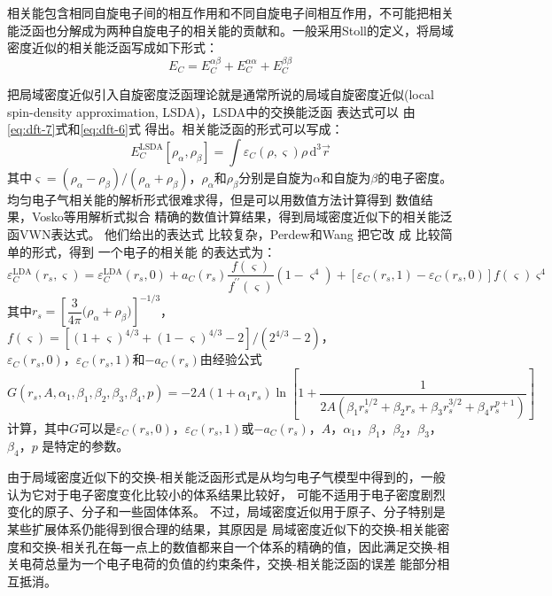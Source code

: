 相关能包含相同自旋电子间的相互作用和不同自旋电子间相互作用，不可能把相关能泛函也分解成为两种自旋电子的相关能的贡献和。一般采用Stoll的定义，将局域密度近似的相关能泛函写成如下形式：
\begin{equation}
  E_C=E_C^{\alpha\beta}+E_C^{\alpha\alpha}+E_C^{\beta\beta}
  \label{eq:dft-17}
\end{equation}

把局域密度近似引入自旋密度泛函理论就是通常所说的局域{自旋}密度近似(local spin-density approximation, LSDA)，LSDA中的交换能{泛函}%
{表达}式可以%
{由}\eqref{eq:dft-7}式和\eqref{eq:dft-6}式%
{得}出{。}相关能泛函的形式可以写成：
$$E_C^{\mathrm{LSDA}}[\rho_{\alpha},\rho_{\beta}]=\int{\varepsilon_C(\rho,\varsigma)\rho\,\textrm{d}^3\vec{r}}$$
其中$\varsigma=(\rho_{\alpha}-\rho_{\beta})
/(\rho_{\alpha}+\rho_{\beta})
$，$\rho_{\alpha}$和$\rho_{\beta}$分别是自旋为$\alpha$和自旋为$\beta$的电子密度。均匀电子气相关能的解析形式很难求得，但是可以用数值方法计算得到%
数值结果，Vosko等用解析式拟合%
精确的数值计算结果，得到局域密度近似下的相关能泛函VWN表达式{。}%
他们给出的表达式%
{比较}复杂，Perdew和Wang%
把它改%
成%
{比较}简单的形式，得到%
{一个电子的}相关能%
{的}表达式为：
\begin{equation}
  \label{eq:dft-8}
  \varepsilon_C^{\mathrm{LDA}}(r_s,\varsigma)=\varepsilon_C^{\mathrm{LDA}}(r_s,0)+a_C(r_s)\dfrac{f(\varsigma)}{f^{\prime\prime}(\varsigma)}(1-\varsigma^4)+[\varepsilon_C(r_s,1)-\varepsilon_C(r_s,0)]f(\varsigma)\varsigma^4
\end{equation}
其中$r_s=\left[\dfrac 3{4\pi}\bigl(\rho_{\alpha}+\rho_{\beta}\bigr)\right]^{-1/3}$，$f(\varsigma)=[(1+\varsigma)^{4/3}+(1-\varsigma)^{4/3}-2]/(2^{4/3}-2)$，\\$\varepsilon_C(r_s,0)$，$\varepsilon_C(r_s,1)$和$-a_C(r_s)$由经验公式
$$G(r_s,A,\alpha_1,\beta_1,\beta_2,\beta_3,\beta_4,p)=-2A(1+\alpha_1r_s)\ln\left[1+\dfrac1{2A(\beta_1r_s^{1/2}+\beta_2r_s+\beta_3r_s^{3/2}+\beta_4r_s^{p+1})}\right]$$
计算{，}其中{$G$可以是$\varepsilon_C(r_s,0)$，$\varepsilon_C(r_s,1)$或$-a_C(r_s)$}，$A$，$\alpha_1$，$\beta_1$，$\beta_2$，$\beta_3$，$\beta_4$，$p$%
是{特定的}参数。

由于局域密度近似下的交换-相关能泛函形式是从均匀电子气模型中得到的，一般认为它对于电子密度变化比较小的体系结果比较好，%
{可能}不适用于电子密度剧烈变化的原子、分子和一些固体体系。%
{不过}，局域密度近似用于原子、分子特别是某些扩展体系仍能得到很合理的结果，其原因是%
局域密度近似下的交换-相关能密度和交换-相关孔在每一点上的数值都来自一个体系的精确的值，因此满足交换-相关电荷总量为一个电子电荷的负值的约束条件，交换-相关能泛函的误差%
{能部分}相互抵消。

